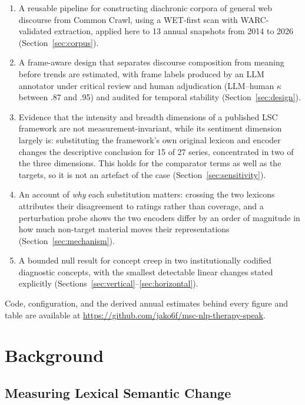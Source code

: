 \documentclass[final]{clv2025}
\begin{document}
\begin{enumerate}
\item A reusable pipeline for constructing diachronic corpora of general web discourse
from Common Crawl, using a WET-first scan with WARC-validated extraction, applied here to
13 annual snapshots from 2014 to 2026 (Section~\ref{sec:corpus}).

\item A frame-aware design that separates discourse composition from meaning before trends
are estimated, with frame labels produced by an LLM annotator under critical review and
human adjudication (LLM--human $\kappa$ between .87 and .95) and audited for temporal
stability (Section~\ref{sec:design}).

\item Evidence that the intensity and breadth dimensions of a published LSC framework are
not measurement-invariant, while its sentiment dimension largely is: substituting the
framework's own original lexicon and encoder changes the descriptive conclusion for 15 of 27
series, concentrated in two of the three dimensions. This holds for the comparator terms as
well as the targets, so it is not an artefact of the case (Section~\ref{sec:sensitivity}).

\item An account of \emph{why} each substitution matters: crossing the two lexicons
attributes their disagreement to ratings rather than coverage, and a perturbation probe
shows the two encoders differ by an order of magnitude in how much non-target material
moves their representations (Section~\ref{sec:mechanism}).

\item A bounded null result for concept creep in two institutionally codified diagnostic
concepts, with the smallest detectable linear changes stated explicitly
(Sections~\ref{sec:vertical}--\ref{sec:horizontal}).

\end{enumerate}

Code, configuration, and the derived annual estimates behind every figure and table are
available at \url{https://github.com/jako6f/msc-nlp-therapy-speak}.

\section{Background}

\subsection{Measuring Lexical Semantic Change}
\end{document}
